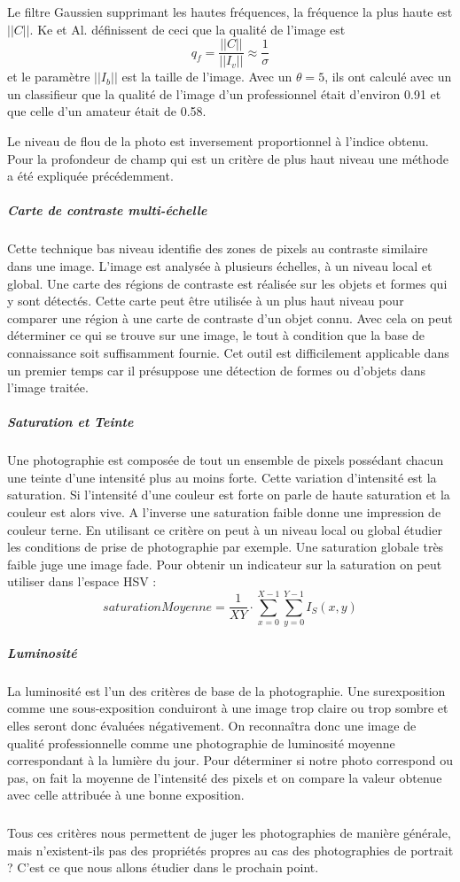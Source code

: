 \documentclass[11pt, french,screen]{report-rd-info}
\begin{document}
Le filtre Gaussien supprimant les hautes fréquences, la fréquence la plus haute est $||C||$. Ke et Al. définissent de ceci que la qualité de l'image est 
\begin{equation}
q_f = \frac{||C||}{||I_v||} \approx \frac{1}{\sigma}
\end{equation}
et le paramètre $||I_b||$ est la taille de l'image. Avec un $\theta = 5$, ils ont calculé avec un un classifieur que la qualité de l'image d'un professionnel était d'environ 0.91 et que celle d'un amateur était de 0.58.

Le niveau de flou de la photo est inversement proportionnel à l’indice obtenu. Pour la profondeur de champ qui est un critère de plus haut niveau une méthode a été expliquée précédemment.

\subparagraph{Carte de contraste multi-échelle}
Cette technique bas niveau identifie des zones de pixels au contraste similaire dans une image. L’image est analysée à plusieurs échelles, à un niveau local et global. Une carte des régions de contraste est réalisée sur les objets et formes qui y sont détectés. Cette carte peut être utilisée à un plus haut niveau pour comparer une région à une carte de contraste d’un objet connu. Avec cela on peut déterminer ce qui se trouve sur une image, le tout à condition que la base de connaissance soit suffisamment fournie. Cet outil est difficilement applicable dans un premier temps car il présuppose une détection de formes ou d’objets dans l’image traitée.
\subparagraph{Saturation et Teinte}
Une photographie est composée de tout un ensemble de pixels possédant chacun une teinte d’une intensité plus au moins forte. Cette variation d’intensité est la saturation. Si l’intensité d’une couleur est forte on parle de haute saturation et la couleur est alors vive. A l’inverse une saturation faible donne une impression de couleur terne. En utilisant ce critère on peut à un niveau local ou global étudier les conditions de prise de photographie par exemple. Une saturation globale très faible juge une image fade. Pour obtenir un indicateur sur la saturation on peut utiliser dans l'espace HSV : 
\begin{equation}
saturationMoyenne = \frac{1}{XY}\cdot \sum_{x=0}^{X-1} \sum_{y=0}^{Y-1} I_S(x,y)  
\end{equation}

\subparagraph{Luminosité}
La luminosité est l’un des critères de base de la photographie. Une surexposition  comme une sous-exposition conduiront à une image trop claire ou trop sombre et elles seront donc évaluées négativement. On reconnaîtra donc une image de qualité professionnelle comme une photographie de luminosité moyenne correspondant à la lumière du jour. Pour déterminer si notre photo correspond ou pas, on fait la moyenne de l’intensité des pixels et on compare la valeur obtenue avec celle attribuée à une bonne exposition.
\subparagraph{}
Tous ces critères nous permettent de juger les photographies de manière générale, mais n'existent-ils pas des propriétés propres au cas des photographies de portrait ? C'est ce que nous allons étudier dans le prochain point.
\end{document}
